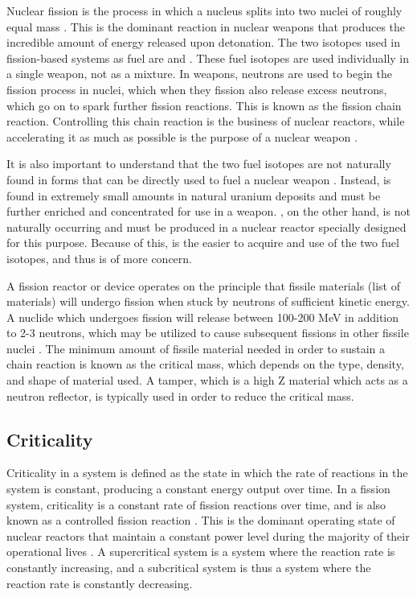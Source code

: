 \documentclass{report}
\begin{document}
Nuclear fission is the process in which a nucleus splits into two nuclei of roughly equal mass \cite{krane1987introductory,Lamarsh2013}. This is the dominant reaction in nuclear weapons that produces the incredible amount of energy released upon detonation. The two isotopes used in fission-based systems as fuel are  and . These fuel isotopes are used individually in a single weapon, not as a mixture. In weapons, neutrons are used to begin the fission process in nuclei, which when they fission also release excess neutrons, which go on to spark further fission reactions. This is known as the fission chain reaction. Controlling this chain reaction is the business of nuclear reactors, while accelerating it as much as possible is the purpose of a nuclear weapon \cite{Duderstadt1976}. 

It is also important to understand that the two fuel isotopes are not naturally found in forms that can be directly used to fuel a nuclear weapon \cite{Benedict1981,Lewis2008}. Instead,  is found in extremely small amounts in natural uranium deposits and must be further enriched and concentrated for use in a weapon. , on the other hand, is not naturally occurring and must be produced in a nuclear reactor specially designed for this purpose. Because of this,  is the easier to acquire and use of the two fuel isotopes, and thus is of more concern. 




A fission reactor or device operates on the principle that fissile materials (list of materials) will undergo fission when stuck by neutrons of sufficient kinetic energy. A nuclide which undergoes fission will release between 100-200 MeV in addition to 2-3 neutrons, which may be utilized to cause subsequent fissions in other fissile nuclei \cite{krane1987introductory}. The minimum amount of fissile material needed in order to sustain a chain reaction is known as the critical mass, which depends on the type, density, and shape of material used. A tamper, which is a high Z material which acts as a neutron reflector, is typically used in order to reduce the critical mass. 

\subsection{Criticality}

Criticality in a system is defined as the state in which the rate of reactions in the system is constant, producing a constant energy output over time. In a fission system, criticality is a constant rate of fission reactions over time, and is also known as a controlled fission reaction \cite{Duderstadt1976}. This is the dominant operating state of nuclear reactors that maintain a constant power level during the majority of their operational lives \cite{Ott1983}. A supercritical system is a system where the reaction rate is constantly increasing, and a subcritical system is thus a system where the reaction rate is constantly decreasing. 
\end{document}
